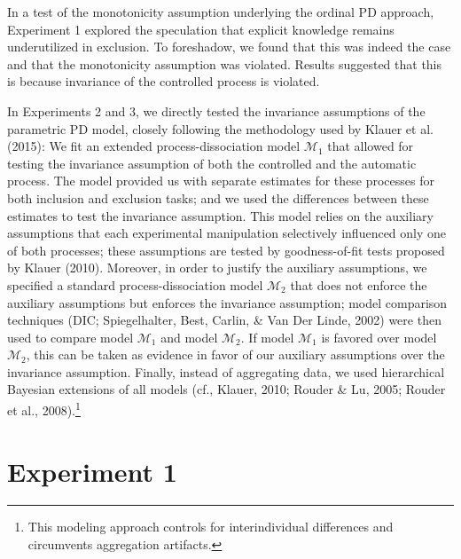 \documentclass[floatsintext,doc]{apa6}
\theoremstyle{definition}
\theoremstyle{definition}
\theoremstyle{definition}
\theoremstyle{remark}
\begin{document}
In a test of the monotonicity assumption underlying the ordinal PD
approach, Experiment 1 explored the speculation that explicit knowledge
remains underutilized in exclusion. To foreshadow, we found that this
was indeed the case and that the monotonicity assumption was violated.
Results suggested that this is because invariance of the controlled
process is violated.

In Experiments 2 and 3, we directly tested the invariance assumptions of
the parametric PD model, closely following the methodology used by
Klauer et al. (2015): We fit an extended process-dissociation model
\(\mathcal{M}_1\) that allowed for testing the invariance assumption of
both the controlled and the automatic process. The model provided us
with separate estimates for these processes for both inclusion and
exclusion tasks; and we used the differences between these estimates to
test the invariance assumption. This model relies on the auxiliary
assumptions that each experimental manipulation selectively influenced
only one of both processes; these assumptions are tested by
goodness-of-fit tests proposed by Klauer (2010). Moreover, in order to
justify the auxiliary assumptions, we specified a standard
process-dissociation model \(\mathcal{M}_2\) that does not enforce the
auxiliary assumptions but enforces the invariance assumption; model
comparison techniques (DIC; Spiegelhalter, Best, Carlin, \& Van Der
Linde, 2002) were then used to compare model \(\mathcal{M}_1\) and model
\(\mathcal{M}_2\). If model \(\mathcal{M}_1\) is favored over model
\(\mathcal{M}_2\), this can be taken as evidence in favor of our
auxiliary assumptions over the invariance assumption. Finally, instead
of aggregating data, we used hierarchical Bayesian extensions of all
models (cf., Klauer, 2010; Rouder \& Lu, 2005; Rouder et al.,
2008).\footnote{This modeling approach controls for interindividual
  differences and circumvents aggregation artifacts.}

\section{Experiment 1}\label{experiment-1}
\end{document}
